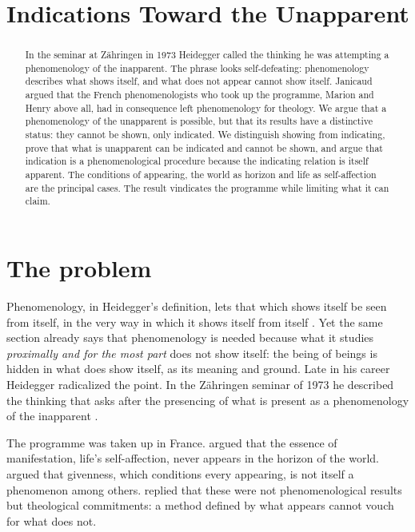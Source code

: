 \documentclass{situationist-preprint}
\title{Indications Toward the Unapparent}
\begin{document}
\maketitle

\begin{abstract}
In the seminar at Zähringen in 1973 Heidegger called the thinking he was attempting a phenomenology of the inapparent. The phrase looks self-defeating: phenomenology describes what shows itself, and what does not appear cannot show itself. Janicaud argued that the French phenomenologists who took up the programme, Marion and Henry above all, had in consequence left phenomenology for theology. We argue that a phenomenology of the unapparent is possible, but that its results have a distinctive status: they cannot be shown, only indicated. We distinguish showing from indicating, prove that what is unapparent can be indicated and cannot be shown, and argue that indication is a phenomenological procedure because the indicating relation is itself apparent. The conditions of appearing, the world as horizon and life as self-affection are the principal cases. The result vindicates the programme while limiting what it can claim.
\end{abstract}

\section{The problem}

Phenomenology, in Heidegger's definition, lets that which shows itself be seen from itself, in the very way in which it shows itself from itself \citep[§7]{Heidegger1927}. Yet the same section already says that phenomenology is needed because what it studies \emph{proximally and for the most part} does not show itself: the being of beings is hidden in what does show itself, as its meaning and ground. Late in his career Heidegger radicalized the point. In the Zähringen seminar of 1973 he described the thinking that asks after the presencing of what is present as a phenomenology of the inapparent \citep{Heidegger2003}.

The programme was taken up in France. \citet{Henry1963} argued that the essence of manifestation, life's self-affection, never appears in the horizon of the world. \citet{Marion1997} argued that givenness, which conditions every appearing, is not itself a phenomenon among others. \citet{Janicaud1991} replied that these were not phenomenological results but theological commitments: a method defined by what appears cannot vouch for what does not.
\end{document}
